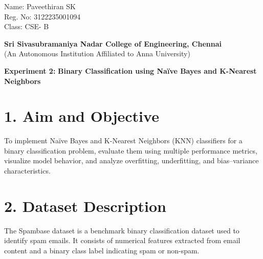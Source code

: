 \documentclass[11pt]{article}
\begin{document}
\begin{flushright}
    Name: Paveethiran SK \\
    Reg. No: 3122235001094 \\
    Class: CSE- B
\end{flushright}
\begin{center}

    \large \textbf{Sri Sivasubramaniya Nadar College of Engineering, Chennai} \\
    (An Autonomous Institution Affiliated to Anna University) \\
    \vspace{0.3cm}
\end{center}

\begin{table}[!h]
\renewcommand{\arraystretch}{1.5}
\end{table}

\begin{center}
\textbf{ Experiment 2:}
\textbf{Binary Classification using Naïve Bayes and K-Nearest Neighbors}
\end{center}


\section*{1. Aim and Objective}
To implement Naïve Bayes and K-Nearest Neighbors (KNN) classifiers for a binary classification problem, evaluate them using multiple performance metrics, visualize model behavior, and analyze overfitting, underfitting, and bias–variance characteristics.


\section*{2. Dataset Description}
The Spambase dataset is a benchmark binary classification dataset used to identify spam emails. It consists of numerical features extracted from email content and a binary class label indicating spam or non-spam.
\end{document}

